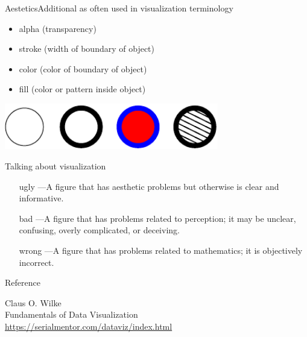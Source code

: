 \documentclass[10pt]{beamer}
\begin{document}

\begin{frame}{Aestetics}{Additional as often used in visualization terminology}
  \begin{itemize}
     \item alpha (transparency)
     \item stroke (width of boundary of object)
     \item color (color of boundary of object)
     \item fill (color or pattern inside object)
  \end{itemize}
  \centering \includegraphics[width=0.7\textwidth]{pics/combi.pdf}
\end{frame}


\begin{frame}{Talking about visualization}{}
   \begin{itemize}
     \item[ugly]—A figure that has aesthetic problems but otherwise is clear and informative.
     \item[bad]—A figure that has problems related to perception; it may be unclear, confusing, overly complicated, or deceiving.
     \item[wrong]—A figure that has problems related to mathematics; it is objectively incorrect.
   \end{itemize}
\end{frame}

\begin{frame}{Reference}{}

  Claus O. Wilke\\
  Fundamentals of Data Visualization\\
  \url{https://serialmentor.com/dataviz/index.html}

\end{frame}
\end{document}
